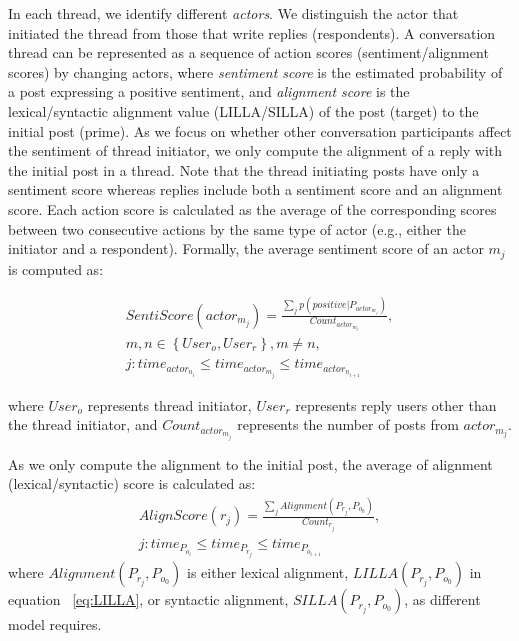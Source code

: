 In each thread, we identify different \emph{actors}.  We distinguish the actor that initiated the thread from those that write replies (respondents). A conversation thread can be represented as a sequence of action scores (sentiment/alignment scores) by changing actors, where \emph{sentiment score} is the estimated probability of a post expressing a positive sentiment, and \emph{alignment score} is the lexical/syntactic alignment value (LILLA/SILLA) of the post (target) to the initial post (prime). As we focus on whether other conversation participants affect the sentiment of thread initiator, we only compute the alignment of a reply with the initial post in a thread. Note that the thread initiating posts have only a sentiment score whereas replies include both a sentiment score and an alignment score. Each action score is calculated as the average of the corresponding scores between two consecutive actions by the same type of actor (e.g., either the initiator and a respondent). Formally, the average sentiment score of an actor $m_{j}$ is computed as:

\begin{equation}
\begin{split}
SentiScore(actor_{m_{j}}) = \frac{\sum_{j}  p(positive|P_{actor_{m_{j}}})}{Count_{actor_{m_{j}}}},\\ m,n \in \left \{User_{o}, User_{r} \right \}, m \neq n, \\ j:time_{actor_{n_{i}}} \leq time_{actor_{m_{j}}} \leq time_{actor_{n_{i+1}}}
\end{split}
\end{equation}

where $User_{o}$ represents thread initiator, $User_{r}$ represents reply users other than the thread initiator, and $Count_{actor_{m_j}}$ represents the number of posts from $actor_{m_{j}}$.

As we only compute the alignment to the initial post, the average of alignment (lexical/syntactic) score is calculated as:
\begin{equation}
\begin{split}
AlignScore(r_{j})= \frac{\sum_{j} Alignment(P_{r_{j}},P_{o_{0}})}{Count_{r_{j}}},\\ j:time_{P_{o_{i}}} \leq time_{P_{r_{j}}} \leq time_{P_{o_{i+1}}}
\end{split}
\end{equation}
where $Alignment(P_{r_{j}},P_{o_{0}})$ is either lexical alignment, $LILLA(P_{r_{j}},P_{o_{0}})$ in equation ~\ref{eq:LILLA}, or syntactic alignment, $SILLA(P_{r_{j}},P_{o_{0}})$, as different model requires.


